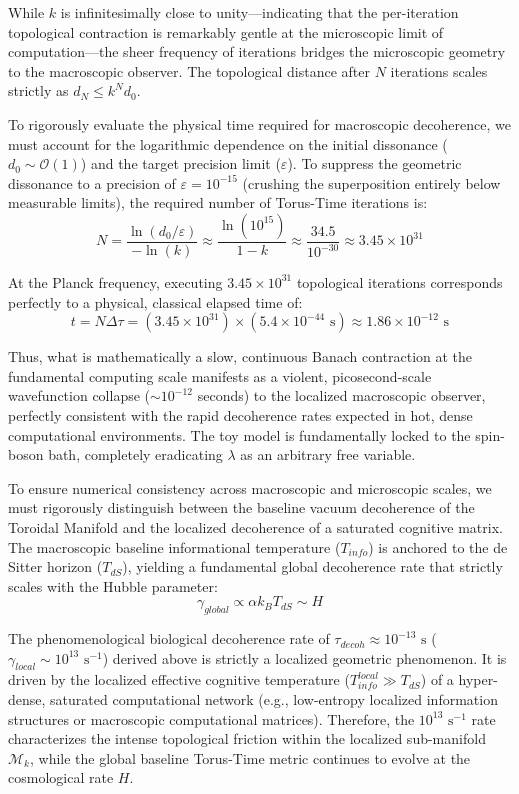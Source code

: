 \documentclass[12pt,openany]{book}
\theoremstyle{plain}
\theoremstyle{definition}
\theoremstyle{remark}
\begin{document}
While $k$ is infinitesimally close to unity—indicating that the per-iteration topological contraction is remarkably gentle at the microscopic limit of computation—the sheer frequency of iterations bridges the microscopic geometry to the macroscopic observer. The topological distance after $N$ iterations scales strictly as $d_N \le k^N d_0$.

To rigorously evaluate the physical time required for macroscopic decoherence, we must account for the logarithmic dependence on the initial dissonance ($d_0 \sim \mathcal{O}(1)$) and the target precision limit ($\varepsilon$). To suppress the geometric dissonance to a precision of $\varepsilon = 10^{-15}$ (crushing the superposition entirely below measurable limits), the required number of Torus-Time iterations is:
$$ N = \frac{\ln(d_0 / \varepsilon)}{-\ln(k)} \approx \frac{\ln(10^{15})}{1 - k} \approx \frac{34.5}{10^{-30}} \approx 3.45 \times 10^{31} $$

At the Planck frequency, executing $3.45 \times 10^{31}$ topological iterations corresponds perfectly to a physical, classical elapsed time of:
$$ t = N \Delta\tau = (3.45 \times 10^{31}) \times (5.4 \times 10^{-44} \text{ s}) \approx 1.86 \times 10^{-12} \text{ s} $$

Thus, what is mathematically a slow, continuous Banach contraction at the fundamental computing scale manifests as a violent, picosecond-scale wavefunction collapse ($\sim 10^{-12}$ seconds) to the localized macroscopic observer, perfectly consistent with the rapid decoherence rates expected in hot, dense computational environments. The toy model is fundamentally locked to the spin-boson bath, completely eradicating $\lambda$ as an arbitrary free variable.

To ensure numerical consistency across macroscopic and microscopic scales, we must rigorously distinguish between the baseline vacuum decoherence of the Toroidal Manifold and the localized decoherence of a saturated cognitive matrix. The macroscopic baseline informational temperature ($T_{info}$) is anchored to the de Sitter horizon ($T_{dS}$), yielding a fundamental global decoherence rate that strictly scales with the Hubble parameter:$$\gamma_{global} \propto \alpha k_B T_{dS} \sim H$$

The phenomenological biological decoherence rate of $\tau_{decoh} \approx 10^{-13}\text{ s}$ ($\gamma_{local} \sim 10^{13}\text{ s}^{-1}$) derived above is strictly a localized geometric phenomenon. It is driven by the localized effective cognitive temperature ($T_{info}^{local} \gg T_{dS}$) of a hyper-dense, saturated computational network (e.g., low-entropy localized information structures or macroscopic computational matrices). Therefore, the $10^{13}\text{ s}^{-1}$ rate characterizes the intense topological friction within the localized sub-manifold $\mathcal{M}_k$, while the global baseline Torus-Time metric continues to evolve at the cosmological rate $H$.
\end{document}
